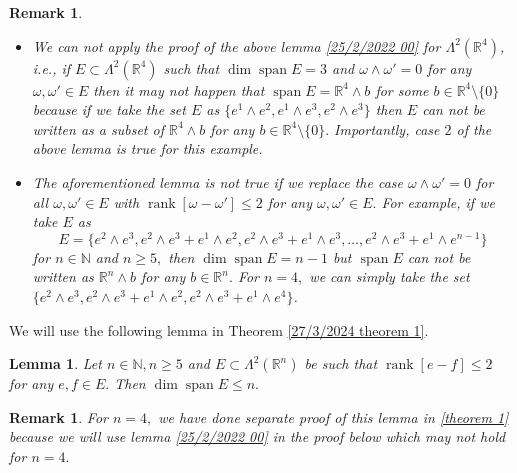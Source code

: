 \documentclass[11pt, a4paper, reqno]{amsart}
\numberwithin{equation}{section}
\newcommand{\spann}{\operatorname{span}}
\newcommand{\meas}{\operatorname{meas}}
\newcommand{\rank}{\operatorname{rank}}
\newcommand{\curl}{\operatorname{curl}}
\newtheorem{lemma}[theorem]{Lemma}
\newtheorem{remark}[theorem]{Remark}
\begin{document}
\begin{remark}
\ \ 
\begin{itemize}
\item[(i)] We can not apply the proof of the above lemma \ref{25/2/2022 00} for $\Lambda^2(\mathbb R^4)$, i.e., if $E\subset \Lambda^2(\mathbb R^4)$ such that $\dim \spann E=3$ and $\omega\wedge \omega'=0$ for any $\omega,\omega' \in E$ then it may not happen that $\spann E =\mathbb R^4\wedge b$ for some $b\in \mathbb R^4\setminus \{0\}$ because if we take the set $E$ as $\{e^1\wedge e^2, e^1\wedge e^3,e^2\wedge e^3\}$ then $E$ can not be written as a subset of $\mathbb R^4\wedge b$ for any $b\in \mathbb R^4\setminus \{0\}.$ Importantly, case $2$ of the above lemma is true for this example. 

\item [(ii)] \label{remark 2 05/04/2024} The aforementioned lemma is not true if we replace the case $\omega \wedge \omega'=0$ for all $\omega, \omega'\in E$ with $\rank [\omega -\omega']\leq 2$ for any $\omega,\omega' \in E.$ For example, if we take $E$ as $$E=\{e^2\wedge e^3, e^2\wedge e^3 + e^1\wedge e^2,e^2\wedge e^3+ e^1\wedge e^3,\ldots, e^2\wedge e^3 + e^1\wedge e^{n-1}\}$$ for $n\in \mathbb N$ and $n\geq 5,$ then $\dim \spann E=n-1$ but $\spann E$ can not be written as $\mathbb R^n \wedge b$ for any $b\in \mathbb R^n.$ For $n=4,$ we can simply take the set $\{e^2\wedge e^3,e^2\wedge e^3+e^1\wedge e^2, e^2\wedge e^3+ e^1\wedge e^4 \}$.
\end{itemize}
\end{remark}
We will use the following lemma in Theorem \ref{27/3/2024 theorem 1}.
\begin{lemma} \label{15/12/2022 1}
Let $n\in \mathbb N, n\geq 5$ and $E\subset \Lambda^2(\mathbb R^n)$ be such that $\rank [e-f]\leq 2$ for any $e,f\in E.$ Then $\dim \spann E\leq n.$


\end{lemma}
\begin{remark}
    For $n=4,$ we have done separate proof of this lemma in \ref{theorem 1} because we will use lemma \ref{25/2/2022 00} in the proof below which may not hold for $n=4.$
\end{remark}
\end{document}
